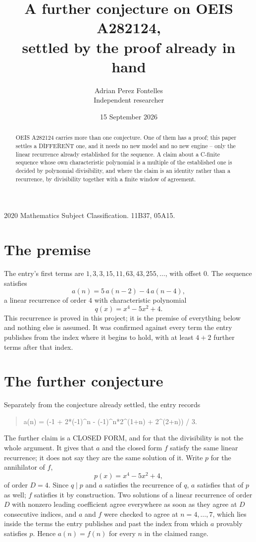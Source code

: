 \documentclass[11pt,a4paper]{article}
\title{A further conjecture on OEIS A282124,\\ \large settled by the proof already in hand}
\author{Adrian Perez Fontelles\\ \small Independent researcher}
\date{15 September 2026}
\theoremstyle{plain}
\theoremstyle{definition}
\begin{document}
\maketitle

\begin{abstract}
OEIS A282124 carries more than one conjecture. One of them has a proof; this paper settles a
DIFFERENT one, and it needs no new model and no new engine -- only the linear recurrence already
established for the sequence. A claim about a C-finite sequence whose own characteristic
polynomial is a multiple of the established one is decided by polynomial divisibility, and where
the claim is an identity rather than a recurrence, by divisibility together with a finite window
of agreement.
\end{abstract}

\noindent\small 2020 Mathematics Subject Classification. 11B37, 05A15.\normalsize

\section{The premise}

The entry's first terms are $1, 3, 3, 15, 11, 63, 43, 255,\dots$, with offset $0$. The sequence satisfies
\[
  a(n)=5\,a(n-2) - 4\,a(n-4) ,
\]
a linear recurrence of order $4$ with characteristic polynomial
\[
  q(x)=x^{4} - 5 x^{2} + 4 .
\]
This recurrence is proved in this project; it is the premise of everything below and nothing else is assumed.
It was confirmed against every term the entry publishes from the index where it begins to hold,
with at least $4+2$ further terms after that index.

\section{The further conjecture}

Separately from the conjecture already settled, the entry records

\begin{quote}\raggedright a(n) = (-1 + 2*(-1)\^{}n - (-1)\^{}n*2\^{}(1+n) + 2\^{}(2+n)) / 3.\end{quote}

The further claim is a CLOSED FORM, and for that the divisibility is not the whole argument. It
gives that $a$ and the closed form $f$ satisfy the same linear recurrence; it does not say they
are the same solution of it. Write $p$ for the annihilator of $f$,
\[
  p(x)=x^{4} - 5 x^{2} + 4 ,
\]
of order $D=4$. Since $q\mid p$ and $a$ satisfies the recurrence of $q$, $a$ satisfies that of
$p$ as well; $f$ satisfies it by construction. Two solutions of a linear recurrence of order $D$
with nonzero leading coefficient agree everywhere as soon as they agree at $D$ consecutive
indices, and $a$ and $f$ were checked to agree at $n=4,\dots,7$,
which lies inside the terms the entry publishes and past the index from which $a$ provably
satisfies $p$. Hence $a(n)=f(n)$ for every $n$ in the claimed range.
\end{document}

